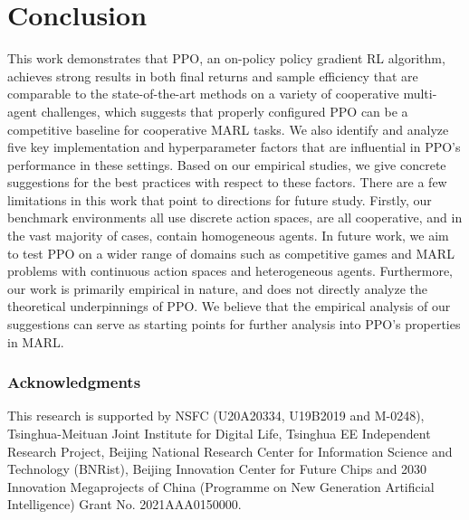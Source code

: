 \documentclass{article}
\theoremstyle{plain}
\theoremstyle{definition}
\theoremstyle{remark}
\begin{document}
\section{Conclusion} \label{sec:conc} 
\vspace{-3mm}
This work demonstrates that PPO, an on-policy policy gradient RL algorithm, achieves strong results in both final returns and sample efficiency that are comparable to the state-of-the-art methods on a variety of cooperative multi-agent challenges, which suggests that properly configured PPO can be a competitive baseline for cooperative MARL tasks.
We also identify and analyze five key implementation and hyperparameter factors that are influential in PPO's performance in these %
settings. Based on our empirical studies, we give concrete suggestions for the best practices with respect to these factors.
There are a few limitations in this work that point to directions for future study. Firstly, our benchmark environments all use discrete action spaces, are all cooperative, and in the vast majority of cases, contain homogeneous agents. In future work, we aim to test PPO on a wider range of domains such as competitive games and MARL problems with continuous action spaces and heterogeneous agents. Furthermore, our work is primarily empirical in nature, and does not directly analyze the theoretical underpinnings of PPO. We believe that the empirical analysis of our suggestions can serve as starting points for further analysis into PPO's properties in MARL.

\vspace{-2mm}
\subsubsection*{Acknowledgments}
\vspace{-2mm}
This research is supported by NSFC (U20A20334, U19B2019 and M-0248), Tsinghua-Meituan Joint Institute for Digital Life, Tsinghua EE Independent Research Project, Beijing National Research Center for Information Science and Technology (BNRist), Beijing Innovation Center for Future Chips and 2030 Innovation Megaprojects of China (Programme on New Generation Artificial Intelligence) Grant No. 2021AAA0150000.

\clearpage
\newpage

\appendix

\newpage






\end{document}
